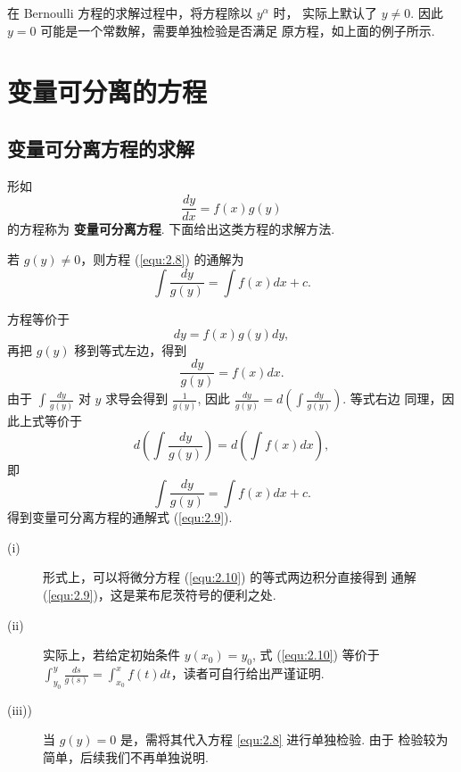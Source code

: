 \begin{rmk}
在 Bernoulli 方程的求解过程中，将方程除以 $y^{\alpha}$ 时，
实际上默认了 $y\neq 0$. 因此 $y=0$ 可能是一个常数解，需要单独检验是否满足
原方程，如上面的例子所示.
\end{rmk}


\section{变量可分离的方程}\label{sec:2.2}
\subsection{变量可分离方程的求解}
形如
\begin{equation}\label{equ:2.8}
\frac{dy}{dx} = f(x)g(y)
\end{equation}
的方程称为 \textbf{变量可分离方程}. 下面给出这类方程的求解方法.

\begin{thm}
若 $g(y)\neq0$，则方程 (\ref{equ:2.8}) 的通解为
\begin{equation}\label{equ:2.9}
\int\frac{dy}{g(y)}=\int f(x)dx +c.
\end{equation}
\end{thm}
\begin{pf1}
方程等价于
\[
dy=f(x)g(y)dy,
\]
再把 $g(y)$ 移到等式左边，得到
\begin{equation}\label{equ:2.10}
\frac{dy}{g(y)}=f(x)dx.
\end{equation}
由于 $\int\frac{dy}{g(y)}$ 对 $y$ 求导会得到 $\frac{1}{g(y)}$, 
因此 $\frac{dy}{g(y)}=d\left(\int\frac{dy}{g(y)}\right)$. 等式右边
同理，因此上式等价于
\[
d\left(\int\frac{dy}{g(y)}\right)=d\left(\int f(x)dx\right),
\]
即
\[
\int\frac{dy}{g(y)}=\int f(x)dx+c.
\]
得到变量可分离方程的通解式 (\ref{equ:2.9}).
\end{pf1}
\begin{rmk}
\begin{description}
\item[(i)] 形式上，可以将微分方程 (\ref{equ:2.10}) 的等式两边积分直接得到
通解 (\ref{equ:2.9})，这是莱布尼茨符号的便利之处.
\item[(ii)] 实际上，若给定初始条件 $y(x_0)=y_0$, 式 (\ref{equ:2.10}) 等价于
$\int_{y_0}^{y}\frac{ds}{g(s)}=\int_{x_0}^{x}f(t)dt$，读者可自行给出严谨证明.
\item[(iii))] 当 $g(y)=0$ 是，需将其代入方程 \ref{equ:2.8} 进行单独检验. 由于
检验较为简单，后续我们不再单独说明.
\end{description}

\end{rmk}
